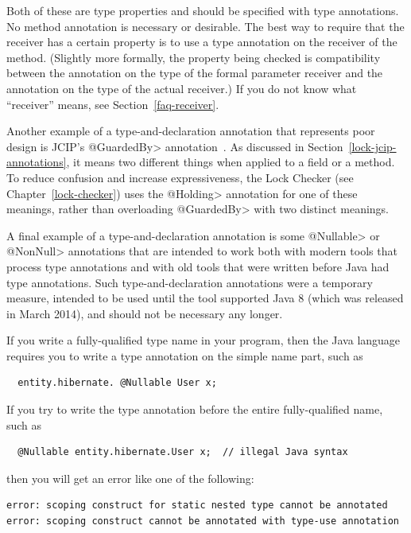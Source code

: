 Both of these are type properties and should be specified with type
annotations.  No method annotation is necessary or desirable.  The best way
to require that the receiver has a certain property is to use a type
annotation on the receiver of the method.  (Slightly more formally, the
property being checked is compatibility between the annotation on the type
of the formal parameter receiver and the annotation on the type of the
actual receiver.)  If you do not know what ``receiver'' means, see
Section~\ref{faq-receiver}.

Another example of a type-and-declaration annotation that represents poor
design is JCIP's \<@GuardedBy> annotation~\cite{Goetz2006}.  As discussed
in Section~\ref{lock-jcip-annotations}, it means two different things when
applied to a field or a method.  To reduce confusion and increase
expressiveness, the Lock Checker (see Chapter~\ref{lock-checker}) uses the
\<@Holding> annotation for one of these meanings, rather than overloading
\<@GuardedBy> with two distinct meanings.


A final example of a type-and-declaration annotation is some \<@Nullable>
or \<@NonNull> annotations that are intended to work both with modern tools
that process type annotations and with old tools that were written before
Java had type annotations.  Such type-and-declaration annotations were a
temporary measure, intended to be used until the tool supported Java 8
(which was released in March 2014), and
should not be necessary any longer.



If you write a fully-qualified type name in your program, then the Java
language requires you to write a type annotation on the simple name part,
such as
\begin{Verbatim}
  entity.hibernate. @Nullable User x;
\end{Verbatim}

If you try to write the type annotation before the entire fully-qualified
name, such as
\begin{Verbatim}
  @Nullable entity.hibernate.User x;  // illegal Java syntax
\end{Verbatim}
\noindent
then you will get an error like one of the following:
\begin{Verbatim}
error: scoping construct for static nested type cannot be annotated
error: scoping construct cannot be annotated with type-use annotation
\end{Verbatim}


